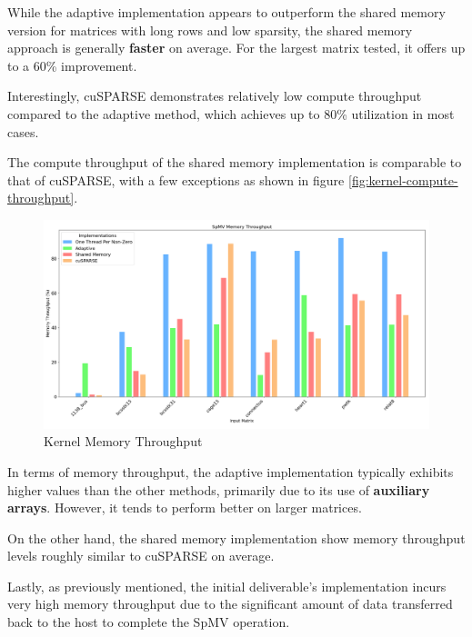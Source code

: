 \documentclass[conference]{IEEEtran}
\begin{document}
        While the adaptive implementation appears to outperform the shared
        memory version for matrices with long rows and low sparsity, the shared
        memory approach is generally \textbf{faster} on average.
        For the largest matrix tested, it offers up to a 60\% improvement.

        Interestingly, cuSPARSE demonstrates relatively low compute throughput
        compared to the adaptive method, which achieves up to 80\% utilization
        in most cases.
        
        The compute throughput of the shared memory implementation is
        comparable to that of cuSPARSE, with a few exceptions as shown in
        figure \ref{fig:kernel-compute-throughput}.

        \begin{figure}[ht]
            \centering
            \includegraphics[width=\linewidth]{kernel-memory-throughput.png}
            \caption{Kernel Memory Throughput}
            \label{fig:kernel-memory-throughput}
        \end{figure}

        In terms of memory throughput, the adaptive implementation typically
        exhibits higher values than the other methods, primarily due to its use
        of \textbf{auxiliary arrays}.
        However, it tends to perform better on larger matrices.

        On the other hand, the shared memory implementation show memory
        throughput levels roughly similar to cuSPARSE on average.
        
        Lastly, as previously mentioned, the initial deliverable’s
        implementation incurs very high memory throughput due to the
        significant amount of data transferred back to the host to complete the
        SpMV operation.
\end{document}
